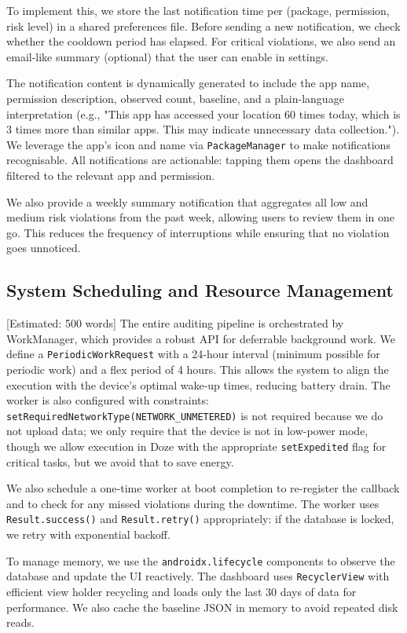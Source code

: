 To implement this, we store the last notification time per (package, permission, risk level) in a shared preferences file. Before sending a new notification, we check whether the cooldown period has elapsed. For critical violations, we also send an email-like summary (optional) that the user can enable in settings.

The notification content is dynamically generated to include the app name, permission description, observed count, baseline, and a plain-language interpretation (e.g., "This app has accessed your location 60 times today, which is 3 times more than similar apps. This may indicate unnecessary data collection."). We leverage the app's icon and name via \texttt{PackageManager} to make notifications recognisable. All notifications are actionable: tapping them opens the dashboard filtered to the relevant app and permission.

We also provide a weekly summary notification that aggregates all low and medium risk violations from the past week, allowing users to review them in one go. This reduces the frequency of interruptions while ensuring that no violation goes unnoticed.

\subsection{System Scheduling and Resource Management} [Estimated: 500 words]
The entire auditing pipeline is orchestrated by WorkManager, which provides a robust API for deferrable background work. We define a \texttt{PeriodicWorkRequest} with a 24-hour interval (minimum possible for periodic work) and a flex period of 4 hours. This allows the system to align the execution with the device's optimal wake-up times, reducing battery drain. The worker is also configured with constraints: \texttt{setRequiredNetworkType(NETWORK\_UNMETERED)} is not required because we do not upload data; we only require that the device is not in low-power mode, though we allow execution in Doze with the appropriate \texttt{setExpedited} flag for critical tasks, but we avoid that to save energy.

We also schedule a one-time worker at boot completion to re-register the callback and to check for any missed violations during the downtime. The worker uses \texttt{Result.success()} and \texttt{Result.retry()} appropriately: if the database is locked, we retry with exponential backoff.

To manage memory, we use the \texttt{androidx.lifecycle} components to observe the database and update the UI reactively. The dashboard uses \texttt{RecyclerView} with efficient view holder recycling and loads only the last 30 days of data for performance. We also cache the baseline JSON in memory to avoid repeated disk reads.

